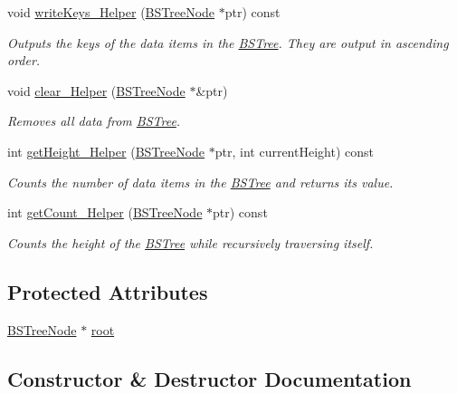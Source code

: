 \begin{DoxyCompactItemize}
void \hyperlink{class_b_s_tree_a41d50aacd563ee862fae2ad9cc9072f2}{write\+Keys\+\_\+\+Helper} (\hyperlink{class_b_s_tree_1_1_b_s_tree_node}{B\+S\+Tree\+Node} $\ast$ptr) const 
\begin{DoxyCompactList}\small\item\em Outputs the keys of the data items in the \hyperlink{class_b_s_tree}{B\+S\+Tree}. They are output in ascending order. \end{DoxyCompactList}\item 
void \hyperlink{class_b_s_tree_a495825dc4b57ad4a2d1afa5836c04fe3}{clear\+\_\+\+Helper} (\hyperlink{class_b_s_tree_1_1_b_s_tree_node}{B\+S\+Tree\+Node} $\ast$\&ptr)
\begin{DoxyCompactList}\small\item\em Removes all data from \hyperlink{class_b_s_tree}{B\+S\+Tree}. \end{DoxyCompactList}\item 
int \hyperlink{class_b_s_tree_acf3a9c10926e83c62d02a415f01911c0}{get\+Height\+\_\+\+Helper} (\hyperlink{class_b_s_tree_1_1_b_s_tree_node}{B\+S\+Tree\+Node} $\ast$ptr, int current\+Height) const 
\begin{DoxyCompactList}\small\item\em Counts the number of data items in the \hyperlink{class_b_s_tree}{B\+S\+Tree} and returns its value. \end{DoxyCompactList}\item 
int \hyperlink{class_b_s_tree_ac27b5f03e47d553c28e26e37b61e6cc0}{get\+Count\+\_\+\+Helper} (\hyperlink{class_b_s_tree_1_1_b_s_tree_node}{B\+S\+Tree\+Node} $\ast$ptr) const 
\begin{DoxyCompactList}\small\item\em Counts the height of the \hyperlink{class_b_s_tree}{B\+S\+Tree} while recursively traversing itself. \end{DoxyCompactList}\end{DoxyCompactItemize}
\subsection*{Protected Attributes}
\begin{DoxyCompactItemize}
\item 
\hyperlink{class_b_s_tree_1_1_b_s_tree_node}{B\+S\+Tree\+Node} $\ast$ \hyperlink{class_b_s_tree_a83534afce9094181ac031f9f596a8625}{root}
\end{DoxyCompactItemize}


\subsection{Constructor \& Destructor Documentation}
